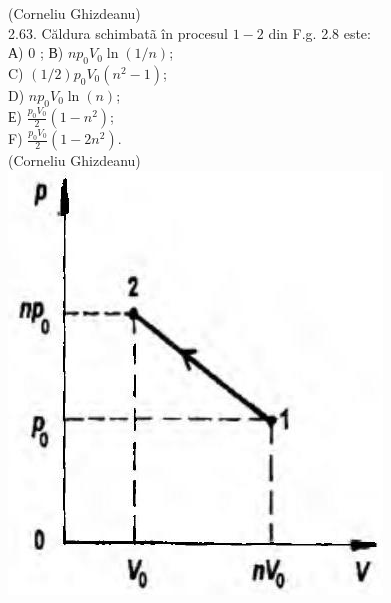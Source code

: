\documentclass[10pt]{article}
\begin{document}
(Corneliu Ghizdeanu)\\
2.63. Căldura schimbatã în procesul $1-2$ din F.g. 2.8 este:\\
А) 0 ; В) $n p_{0} V_{0} \ln (1 / n)$;\\
C) $(1 / 2) p_{0} V_{0}\left(n^{2}-1\right)$;\\
D) $n p_{0} V_{0} \ln (n)$;\\
Е) $\frac{p_{0} V_{0}}{2}\left(1-n^{2}\right)$;\\
F) $\frac{p_{0} V_{0}}{2}\left(1-2 n^{2}\right)$.\\
(Corneliu Ghizdeanu)\\
\includegraphics[max width=\textwidth, center]{2025_07_01_5b3ff9fa0d508c8e9f17g-087}
\end{document}
